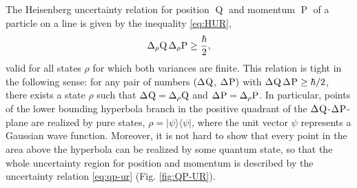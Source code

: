 The Heisenberg uncertainty relation for position $\operatorname{Q}$ and momentum $\operatorname{P}$ of a particle on a line is given by the inequality \eqref{eq:HUR},
\begin{equation}\label{eq:qp-ur}
  \sdevr{\opq}\,\sdevr{\opp}\ge\frac{\hbar}{2},
\end{equation}
valid for all states $\rho$ for which both variances are finite. This relation
is tight  in the following sense: for any pair of numbers $(\sdev{\opq}$, $\sdev{\opp})$ with $\sdev{\opq}\,\sdev{\opp}\ge \hbar/2$, there exists a state $\rho$ such that $\sdev{\opq} =\sdevr{\opq}$ and $\sdev{\opp}=\sdevr{\opp}$.  In particular, points of the lower bounding hyperbola branch in the positive quadrant of the $\sdev{\opq}$-$\sdev{\opp}$-plane are realized by pure states, $\rho=|\psi\rangle\langle\psi|$, where the unit vector $\psi$ represents a Gaussian wave function. Moreover, it is not hard to show that every point in the area above the hyperbola can be realized by some quantum state, so that the whole uncertainty region for position and momentum is described by the uncertainty relation \eqref{eq:qp-ur} (Fig. \ref{fig:QP-UR}).

